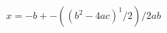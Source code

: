 \documentclass[preview]{standalone}
\begin{document}
\begin{align*}
x=-b +- ((b^2-4ac)^1/2)/2ab
\end{align*}
\end{document}
